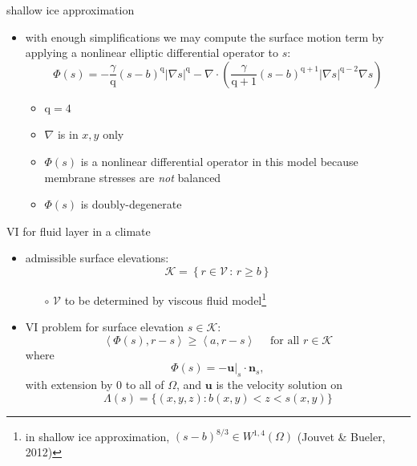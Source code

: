 \documentclass[svgnames,
               hyperref={colorlinks,citecolor=DeepPink4,linkcolor=FireBrick,urlcolor=Maroon},
               usepdftitle=false]  %
               {beamer}
\newcommand{\grad}{\nabla}
\newcommand{\bn}{\mathbf{n}}
\newcommand{\bu}{\mathbf{u}}
\newcommand{\ip}[2]{\left<#1,#2\right>}
\newcommand{\qq}{{\text{q}}}
\begin{document}
\begin{frame}{shallow ice approximation}

\begin{itemize}
\item with enough simplifications we may compute the surface motion term by applying a nonlinear elliptic differential operator to $s$:
    $$\Phi(s) = - \frac{\gamma}{\qq} (s-b)^{\qq} |\grad s|^{\qq} - \grad \cdot\left(\frac{\gamma}{\qq+1} (s-b)^{\qq+1} |\grad s|^{\qq-2} \grad s\right)$$
    \begin{itemize}
    \item $\qq = 4$
    \item $\grad$ is in $x,y$ only
    \item $\Phi(s)$ is a nonlinear \alert{differential operator} in this model because membrane stresses are \emph{not} balanced
    \item $\Phi(s)$ is doubly-degenerate
    \end{itemize}
\end{itemize}
\end{frame}


\begin{frame}{VI for fluid layer in a climate}

\begin{itemize}
\item admissible surface elevations:
    $$\mathcal{K} = \left\{r \in \mathcal{V} \,:\, r \ge b\right\}$$

    \begin{itemize}
    \item[$\circ$] $\mathcal{V}$ to be determined by viscous fluid model\footnote{in shallow ice approximation, $(s-b)^{8/3} \in W^{1,4}(\Omega)$ (Jouvet \& Bueler, 2012)}
    \end{itemize}
\item VI problem for surface elevation $s\in\mathcal{K}$:
	$$\ip{\Phi(s)}{r-s} \ge \ip{a}{r-s} \quad \text{ for all } r \in \mathcal{K}$$
where
    $$\Phi(s)=- \bu|_s \cdot \bn_s,$$
with extension by 0 to all of $\Omega$, and $\bu$ is the velocity solution on
    $$\Lambda(s) = \{(x,y,z) : b(x,y) < z < s(x,y)\}$$
\end{itemize}
\end{frame}
\end{document}
